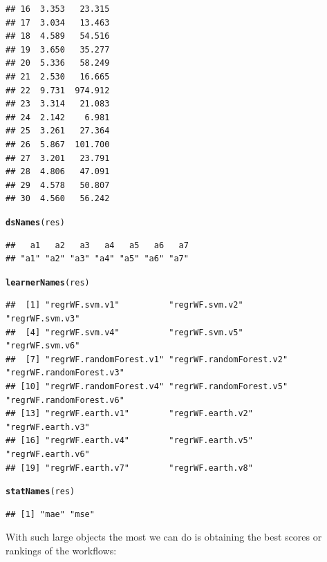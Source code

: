 \documentclass[10pt,a4paper]{article}\usepackage[]{graphicx}\usepackage[]{color}
\makeatletter
\newcommand{\hlstd}[1]{\textcolor[rgb]{0.345,0.345,0.345}{#1}}%
\newcommand{\hlkwd}[1]{\textcolor[rgb]{0.737,0.353,0.396}{\textbf{#1}}}%
\newenvironment{kframe}{%
 \def\at@end@of@kframe{}%
 \ifinner\ifhmode%
  \def\at@end@of@kframe{\end{minipage}}%
  \begin{minipage}{\columnwidth}%
 \fi\fi%
 \def\FrameCommand##1{\hskip\@totalleftmargin \hskip-\fboxsep
 \colorbox{shadecolor}{##1}\hskip-\fboxsep
     \hskip-\linewidth \hskip-\@totalleftmargin \hskip\columnwidth}%
 \MakeFramed {\advance\hsize-\width
   \@totalleftmargin\z@ \linewidth\hsize
   \@setminipage}}%
 {\par\unskip\endMakeFramed%
 \at@end@of@kframe}
\newenvironment{knitrout}{}{} %
\makeatother
\begin{document}
\begin{knitrout}
\begin{kframe}
\begin{verbatim}
## 16  3.353   23.315
## 17  3.034   13.463
## 18  4.589   54.516
## 19  3.650   35.277
## 20  5.336   58.249
## 21  2.530   16.665
## 22  9.731  974.912
## 23  3.314   21.083
## 24  2.142    6.981
## 25  3.261   27.364
## 26  5.867  101.700
## 27  3.201   23.791
## 28  4.806   47.091
## 29  4.578   50.807
## 30  4.560   56.242
\end{verbatim}
\begin{alltt}
\hlkwd{dsNames}\hlstd{(res)}
\end{alltt}
\begin{verbatim}
##   a1   a2   a3   a4   a5   a6   a7 
## "a1" "a2" "a3" "a4" "a5" "a6" "a7"
\end{verbatim}
\begin{alltt}
\hlkwd{learnerNames}\hlstd{(res)}
\end{alltt}
\begin{verbatim}
##  [1] "regrWF.svm.v1"          "regrWF.svm.v2"          "regrWF.svm.v3"         
##  [4] "regrWF.svm.v4"          "regrWF.svm.v5"          "regrWF.svm.v6"         
##  [7] "regrWF.randomForest.v1" "regrWF.randomForest.v2" "regrWF.randomForest.v3"
## [10] "regrWF.randomForest.v4" "regrWF.randomForest.v5" "regrWF.randomForest.v6"
## [13] "regrWF.earth.v1"        "regrWF.earth.v2"        "regrWF.earth.v3"       
## [16] "regrWF.earth.v4"        "regrWF.earth.v5"        "regrWF.earth.v6"       
## [19] "regrWF.earth.v7"        "regrWF.earth.v8"
\end{verbatim}
\begin{alltt}
\hlkwd{statNames}\hlstd{(res)}
\end{alltt}
\begin{verbatim}
## [1] "mae" "mse"
\end{verbatim}
\end{kframe}
\end{knitrout}


With such large objects the most we can do is obtaining the best
scores or rankings of the workflows:
\end{document}
